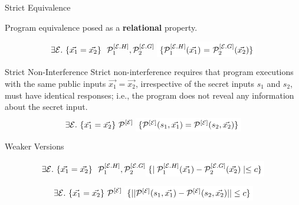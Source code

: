 \begin{frame}{Strict Equivalence}

    Program equivalence posed as a \textbf{relational} property.
    \pause
    \vspace{20pt}
    \begin{tcolorbox}[
        colback=white,
        colframe=green,
        colbacktitle=white!70!green,
        coltitle=black,
        title=\textbf{Relational Synthesis for Program Equivalence},
        enhanced,
        attach boxed title to top left={yshift=-2mm, xshift=0.5cm},%
        ]
        \[
        \exists \E. \ \{\vec{x_1} = \vec{x_2}\}\ \ \proghole{1}{\E.H}, \proghole{2}{\E.G} \ \colorbox{white}{\{\proghole{1}{\E.H}($\vec{x_1}$) = \proghole{2}{\E.G}($\vec{x_2}$)\}}
        \]
    \end{tcolorbox}

\end{frame}


\begin{frame}{Strict Non-Interference}
    Strict non-interference requires that program executions with the same public inputs $\vec{x_1}=\vec{x_2}$, irrespective of the secret inputs $s_1$ and $s_2$, must have identical responses; i.e., the program does not reveal any information about the secret input.
    \begin{align*}
        \exists \E. \ \{\vec{x_1} = \vec{x_2}\} \ \proghole{}{\E} \ \colorbox{white}{$\{ \proghole{}{\E}({s_1}, \vec{x_1}) = \proghole{}{\E}({s_2}, \vec{x_2}) \}$}
    \end{align*}
\end{frame}

\begin{frame}{Weaker Versions}
    \begin{tcolorbox}[
        colback=white,
        colframe=green,
        colbacktitle=white!70!green,
        coltitle=black,
        title=\textbf{Weak Equivalence},
        enhanced,
        attach boxed title to top left={yshift=-2mm, xshift=0.5cm},%
        ]
        \[
        \exists \E. \ \{\vec{x_1} = \vec{x_2}\}\ \ \proghole{1}{\E.H}, \proghole{2}{\E.G} \colorbox{white}{$\{\mid \proghole{1}{\E.H}(\vec{x_1}) - \proghole{2}{\E.G}(\vec{x_2}) \mid \leq c\}$}
        \]
    \end{tcolorbox}
    \begin{tcolorbox}[
        colback=white,
        colframe=green,
        colbacktitle=white!70!green,
        coltitle=black,
        title=\textbf{Weak Non-Interference},
        enhanced,
        attach boxed title to top left={yshift=-2mm, xshift=0.5cm},%
        ]
        \[
        \exists \E. \ \{\vec{x_1} = \vec{x_2}\} \ \proghole{}{\E} \ \colorbox{white}{$\{||\proghole{}{\E}({s_1}, \vec{x_1}) - \proghole{}{\E}({s_2}, \vec{x_2}) || \leq c\} $}
        \]
    \end{tcolorbox}
\end{frame}


